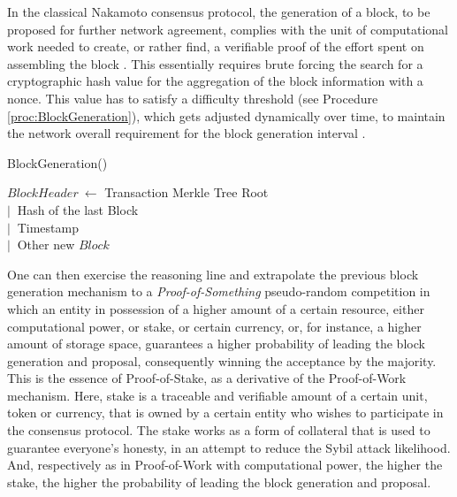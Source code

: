 In the classical Nakamoto consensus protocol, the generation of a block, to be proposed for further network agreement, complies with the unit of computational work needed to create, or rather find, a verifiable proof of the effort spent on assembling the block \cite{nakamoto2008bitcoin}. This essentially requires brute forcing the search for a cryptographic hash value for the aggregation of the block information with a nonce. This value has to satisfy a difficulty threshold (see Procedure \ref{proc:BlockGeneration}), which gets adjusted dynamically over time, to maintain the network overall requirement for the block generation interval \cite{8629877, survey-dist-consensus}.

\begin{procedure} [!h]
	\caption{BlockGeneration()} \label{proc:BlockGeneration}
	\BlankLine
  $BlockHeader \ \gets$ Transaction Merkle Tree Root
  \\ \qquad $| \ $ Hash of the last Block
  \\ \qquad $| \ $ Timestamp
  \\ \qquad $| \ $ Other\;
  \BlankLine
  \Return new $Block$\;
\end{procedure}

One can then exercise the reasoning line and extrapolate the previous block generation mechanism to a \emph{Proof-of-Something} pseudo-random competition in which an entity in possession of a higher amount of a certain resource, either computational power, or stake, or certain currency, or, for instance, a higher amount of storage space, guarantees a higher probability of leading the block generation and proposal, consequently winning the acceptance by the majority. This is the essence of Proof-of-Stake, as a derivative of the Proof-of-Work mechanism. Here, stake is a traceable and verifiable amount of a certain unit, token or currency, that is owned by a certain entity who wishes to participate in the consensus protocol. The stake works as a form of collateral that is used to guarantee everyone's honesty, in an attempt to reduce the Sybil attack likelihood. And, respectively as in Proof-of-Work with computational power, the higher the stake, the higher the probability of leading the block generation and proposal.


